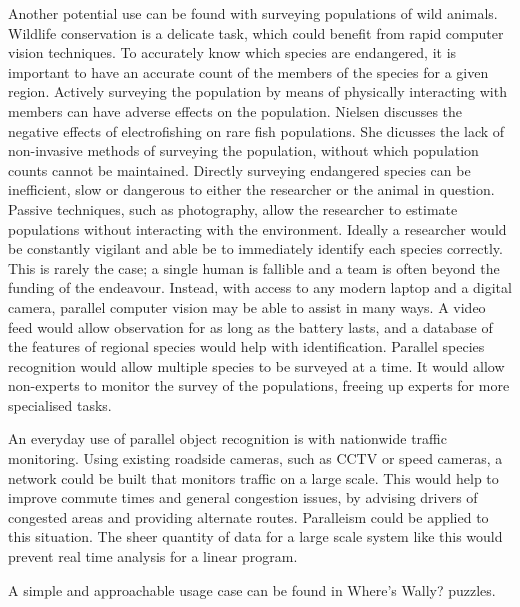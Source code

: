 \documentclass[../main.tex]{subfiles}
\begin{document}
    Another potential use can be found with surveying populations of wild animals.
    Wildlife conservation is a delicate task, which could benefit from rapid computer vision techniques.
    To accurately know which species are endangered, it is important to have an accurate count of the members of the species for a given region.
    Actively surveying the population by means of physically interacting with members can have adverse effects on the population.
    Nielsen \cite{electrofishing} discusses the negative effects of electrofishing on rare fish populations.
    She dicusses the lack of non-invasive methods of surveying the population, without which population counts cannot be maintained.
    Directly surveying endangered species can be inefficient, slow or dangerous to either the researcher or the animal in question.
    Passive techniques, such as photography, allow the researcher to estimate populations without interacting with the environment.
    Ideally a researcher would be constantly vigilant and able be to immediately identify each species correctly.
    This is rarely the case; a single human is fallible and a team is often beyond the funding of the endeavour.
    Instead, with access to any modern laptop and a digital camera, parallel computer vision may be able to assist in many ways.
    A video feed would allow observation for as long as the battery lasts, and a database of the features of regional species would help with identification.
    Parallel species recognition would allow multiple species to be surveyed at a time.
    It would allow non-experts to monitor the survey of the populations, freeing up experts for more specialised tasks.
      
    An everyday use of parallel object recognition is with nationwide traffic monitoring.
    Using existing roadside cameras, such as CCTV or speed cameras, a network could be built that monitors traffic on a large scale.
    This would help to improve commute times and general congestion issues, by advising drivers of congested areas and providing alternate routes.
    Paralleism could be applied to this situation.
    The sheer quantity of data for a large scale system like this would prevent real time analysis for a linear program.

    A simple and approachable usage case can be found in Where's Wally? puzzles.
\end{document}
